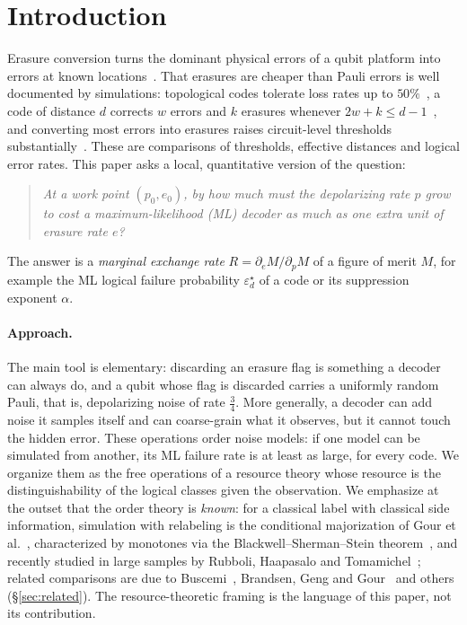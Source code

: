 \documentclass[11pt,a4paper]{article}
\theoremstyle{plain}
\theoremstyle{definition}
\theoremstyle{remark}
\newcommand{\err}{\varepsilon^{\star}}
\begin{document}
\section{Introduction}\label{sec:intro}

Erasure conversion turns the dominant physical errors of a qubit platform into errors at known locations~\cite{WKPT,KubicaErasure,Sahay}. That erasures are cheaper than Pauli errors is well documented by simulations: topological codes tolerate loss rates up to $50\%$~\cite{SBD}, a code of distance $d$ corrects $w$ errors and $k$ erasures whenever $2w+k\le d-1$~\cite{GBP}, and converting most errors into erasures raises circuit-level thresholds substantially~\cite{WKPT,Sahay,KubicaErasure,GRK,GVRK,Chang}. These are comparisons of thresholds, effective distances and logical error rates. This paper asks a local, quantitative version of the question:
\begin{quote}
\emph{At a work point $(p_0,e_0)$, by how much must the depolarizing rate $p$ grow to cost a maximum-likelihood (ML) decoder as much as one extra unit of erasure rate $e$?}
\end{quote}
The answer is a \emph{marginal exchange rate} $R=\partial_e M/\partial_p M$ of a figure of merit $M$, for example the ML logical failure probability $\err_d$ of a code or its suppression exponent $\alpha$.

\paragraph{Approach.}
The main tool is elementary: discarding an erasure flag is something a decoder can always do, and a qubit whose flag is discarded carries a uniformly random Pauli, that is, depolarizing noise of rate $\tfrac34$. More generally, a decoder can add noise it samples itself and can coarse-grain what it observes, but it cannot touch the hidden error. These operations order noise models: if one model can be simulated from another, its ML failure rate is at least as large, for every code. We organize them as the free operations of a resource theory whose resource is the distinguishability of the logical classes given the observation. We emphasize at the outset that the order theory is \emph{known}: for a classical label with classical side information, simulation with relabeling is the conditional majorization of Gour et al.~\cite{GGHKLN}, characterized by monotones via the Blackwell--Sherman--Stein theorem~\cite{Blackwell,Torgersen}, and recently studied in large samples by Rubboli, Haapasalo and Tomamichel~\cite{RHT}; related comparisons are due to Buscemi~\cite{Buscemi12,Buscemi16,Buscemi18}, Brandsen, Geng and Gour~\cite{BGG} and others (\S\ref{sec:related}). The resource-theoretic framing is the language of this paper, not its contribution.
\end{document}
